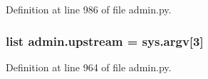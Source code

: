 Definition at line 986 of file admin.\-py.

\hypertarget{namespaceadmin_ae04b67153bc11f5b3a23e4fd760832fb}{
\subsubsection[{upstream}]{\setlength{\rightskip}{0pt plus 5cm}list admin.\-upstream = sys.\-argv\mbox{[}3\mbox{]}}}\label{namespaceadmin_ae04b67153bc11f5b3a23e4fd760832fb}


Definition at line 964 of file admin.\-py.

